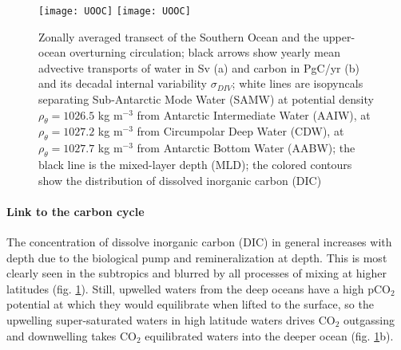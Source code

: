 \documentclass[12pt]{article}
\begin{document}
\begin{figure}[h!]
	\centering
	\texttt{[image: UOOC]}
	\texttt{[image: UOOC]}	
	\vspace{-8mm}
	\caption{Zonally averaged transect of the Southern Ocean and the upper-ocean overturning circulation; black arrows show yearly mean advective transports of water in Sv (a) and carbon in PgC/yr (b) and its decadal internal variability $\sigma_{DIV}$; white lines are isopyncals separating Sub-Antarctic Mode Water (SAMW) at potential density $\rho_{\theta\text{}}=1026.5$ kg m$^{-3}$ from Antarctic Intermediate Water (AAIW), at $\rho_{\theta\text{}}=1027.2$ kg m$^{-3}$ from Circumpolar Deep Water (CDW), at $\rho_{\theta\text{}}=1027.7$ kg m$^{-3}$ from Antarctic Bottom Water (AABW); the black line is the mixed-layer depth (MLD); the colored contours show the distribution of dissolved inorganic carbon (DIC)}
	\label{fig:UOOC_mean}
\end{figure}


\paragraph{Link to the carbon cycle}
The concentration of dissolve inorganic carbon (DIC) in general increases with depth due to the biological pump and remineralization at depth. This is most clearly seen in the subtropics and blurred by all processes of mixing at higher latitudes (fig. \ref{fig:UOOC_mean}). Still, upwelled waters from the deep oceans have a high pCO$_2$ potential at which they would equilibrate when lifted to the surface, so the upwelling super-saturated waters in high latitude waters drives CO$_2$ outgassing and downwelling takes CO$_2$ equilibrated waters into the deeper ocean (fig. \ref{fig:UOOC_mean}b). 

\end{document}
